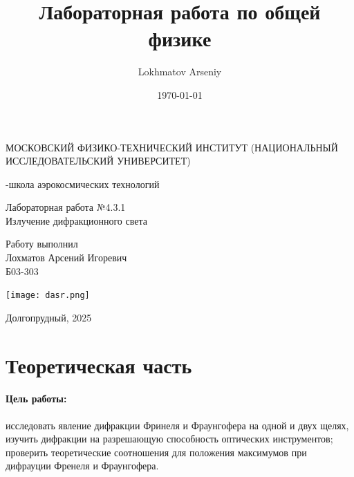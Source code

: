 \documentclass[a4paper,12pt]{article} %
\author{Lokhmatov Arseniy}
\title{Лабораторная работа по общей физике}
\date{\today}
\begin{document}
\begin{titlepage}
    \newpage
    \begin{center}
    {\large МОСКОВСКИЙ ФИЗИКО-ТЕХНИЧЕСКИЙ ИНСТИТУТ (НАЦИОНАЛЬНЫЙ ИССЛЕДОВАТЕЛЬСКИЙ УНИВЕРСИТЕТ)}
    \vspace{1cm}

    {-школа аэрокосмических технологий}
    \vspace{6em}
    \end{center}
    
    \vspace{1.2em}

    \begin{center}
    \Large Лабораторная работа №4.3.1 \\
    Излучение дифракционного света
    \linebreak
    \end{center}
    
    \vspace{11em}
    
    \begin{flushright}
                       {\large Работу выполнил\\
                       Лохматов Арсений Игоревич\\
                       Б03-303 }
    \end{flushright}

    \vspace{\fill}

    \begin{center}
        \texttt{[image: dasr.png]}
    \end{center}

    \begin{center}
    Долгопрудный, 2025
    \end{center}

    \end{titlepage}

\section{Теоретическая часть}

\paragraph{Цель работы:} исследовать явление дифракции Фринеля и Фраунгофера на одной и двух щелях, изучить дифракции на разрешающую способность оптических инструментов; проверить теоретические соотношения для положения максимумов при дифрауции Френеля и Фраунгофера.
\end{document}
